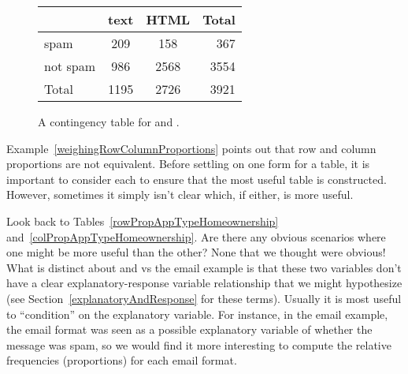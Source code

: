 \begin{figure}[ht]
\centering
\begin{tabular}{l cc r}
  \hline
  & text & HTML & Total \\ 
  \hline
  spam & 209 & 158 & 367 \\ 
  not spam & 986 & 2568 & 3554 \\ 
  \hline
  Total & 1195 & 2726 & 3921 \\
  \hline
\end{tabular}
\caption{A contingency table for  and .}
\label{emailSpamHTMLTableTotals}
\end{figure}

Example~\ref{weighingRowColumnProportions} points out
that row and column proportions are not equivalent.
Before settling on one form for a table,
it is important to consider each to ensure that the
most useful table is constructed.
However, sometimes it simply isn't clear which, if either,
is more useful.

\begin{examplewrap}
\begin{nexample}{Look back to
    Tables~\ref{rowPropAppTypeHomeownership}
    and~\ref{colPropAppTypeHomeownership}.
    Are there any obvious scenarios where one might be more
    useful than the other?}
  None that we thought were obvious!
  What is distinct about 
  and  vs the email example is that
  these two variables don't have a clear explanatory-response
  variable relationship that we might hypothesize
  (see Section~\ref{explanatoryAndResponse} for these terms).
  Usually it is most useful to ``condition'' on the
  explanatory variable.
  For instance, in the email example, the email format
  was seen as a possible explanatory variable of whether
  the message was spam, so we would find it more interesting
  to compute the relative frequencies (proportions)
  for each email format.
\end{nexample}
\end{examplewrap}



